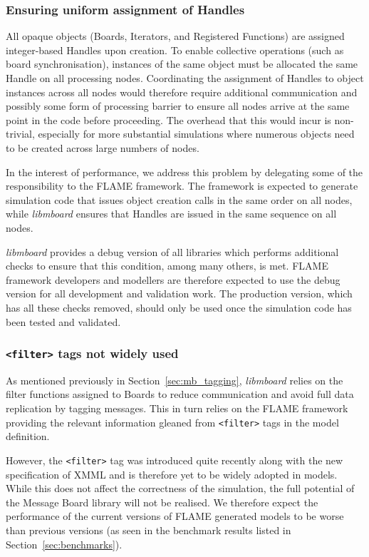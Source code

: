 \subsubsection{Ensuring uniform assignment of Handles}

All opaque objects (Boards, Iterators, and Registered Functions) are assigned integer-based Handles upon creation. To enable collective operations (such as board synchronisation), instances of the same object must be allocated the same Handle on all processing nodes. Coordinating the assignment of Handles to object instances across all nodes would therefore require additional communication and possibly some form of processing barrier to ensure all nodes arrive at the same point in the code before proceeding. 
The overhead that this would incur is non-trivial, especially for more substantial simulations where numerous objects need to be created across large numbers of nodes. 

In the interest of performance, we address this problem by delegating some of the responsibility to the FLAME framework. The framework is expected to generate  simulation code that issues object creation calls in the same order on all nodes, while \textit{libmboard} ensures that Handles are issued in the same sequence on all nodes. 

\textit{libmboard} provides a debug version of all libraries which performs additional checks to ensure that this condition, among many others, is met. FLAME framework developers and modellers are therefore expected to use the debug version for all development and validation work. The production version, which has all these checks removed, should only be used once the simulation code has been tested and validated.


\subsubsection{\texttt{<filter>} tags not widely used}

As mentioned previously in Section~\ref{sec:mb_tagging}, \textit{libmboard} relies on the filter functions assigned to Boards to reduce communication and avoid full data replication by tagging messages. This in turn relies on the FLAME framework providing the relevant information gleaned from \texttt{<filter>} tags in the model definition.

However, the \texttt{<filter>} tag was introduced quite recently along with the new specification of XMML and is therefore yet to be widely adopted in models. While this does not affect the correctness of the simulation, the full potential of the Message Board library will not be realised. We therefore expect the performance of the current versions of FLAME generated models to be worse than previous versions (as seen in the benchmark results listed in Section~\ref{sec:benchmarks}).

